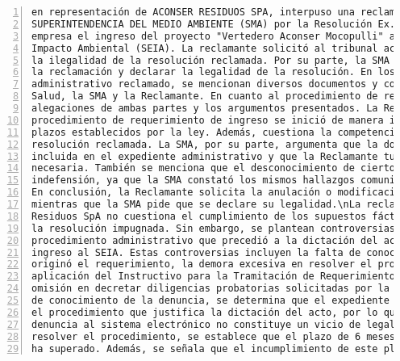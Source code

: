 \begin{Verbatim}[frame=lines, label=Elavoración propia -  Ejemplo de Contexto enviado por el Chatbot a OpenAI
				, fontsize=\scriptsize, numbers=left
				, baselinestretch=0.4
				, formatcom=\color{gray}]
en representación de ACONSER RESIDUOS SPA, interpuso una reclamación contra la
SUPERINTENDENCIA DEL MEDIO AMBIENTE (SMA) por la Resolución Ex. N° 427, que requería a la
empresa el ingreso del proyecto "Vertedero Aconser Mocopulli" al Sistema de Evaluación de
Impacto Ambiental (SEIA). La reclamante solicitó al tribunal acoger su reclamación y declarar
la ilegalidad de la resolución reclamada. Por su parte, la SMA solicitó al tribunal rechazar
la reclamación y declarar la legalidad de la resolución. En los antecedentes del acto
administrativo reclamado, se mencionan diversos documentos y comunicaciones entre la SEREMI de
Salud, la SMA y la Reclamante. En cuanto al procedimiento de reclamación, se detallan las
alegaciones de ambas partes y los argumentos presentados. La Reclamante argumenta que el
procedimiento de requerimiento de ingreso se inició de manera irregular y que se violaron
plazos establecidos por la ley. Además, cuestiona la competencia de la SMA para dictar la
resolución reclamada. La SMA, por su parte, argumenta que la documentación relevante está
incluida en el expediente administrativo y que la Reclamante tuvo acceso a la información
necesaria. También se menciona que el desconocimiento de ciertos documentos no supone
indefensión, ya que la SMA constató los mismos hallazgos comunicados por la SEREMI de Salud.
En conclusión, la Reclamante solicita la anulación o modificación de la resolución reclamada,
mientras que la SMA pide que se declare su legalidad.\nLa reclamación presentada por ACONSER
Residuos SpA no cuestiona el cumplimiento de los supuestos fácticos y jurídicos contenidos en
la resolución impugnada. Sin embargo, se plantean controversias relacionadas con el
procedimiento administrativo que precedió a la dictación del acto terminal de requerimiento de
ingreso al SEIA. Estas controversias incluyen la falta de conocimiento de la denuncia que
originó el requerimiento, la demora excesiva en resolver el procedimiento, la omisión en la
aplicación del Instructivo para la Tramitación de Requerimientos de Ingreso al SEIA y la
omisión en decretar diligencias probatorias solicitadas por la interesada. Respecto a la falta
de conocimiento de la denuncia, se determina que el expediente administrativo físico contiene
el procedimiento que justifica la dictación del acto, por lo que la tardanza en incorporar la
denuncia al sistema electrónico no constituye un vicio de legalidad. En cuanto a la demora en
resolver el procedimiento, se establece que el plazo de 6 meses establecido por la ley no se
ha superado. Además, se señala que el incumplimiento de este plazo no afecta la validez del

\end{Verbatim}
